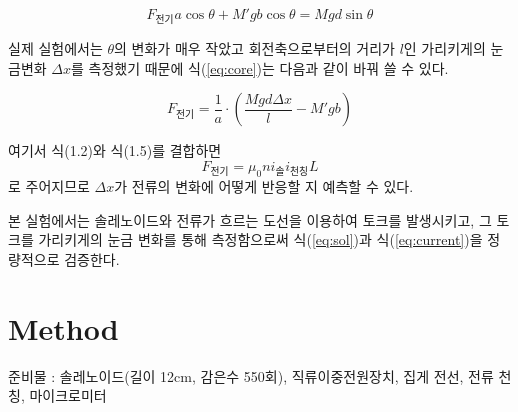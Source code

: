 \documentclass[a4paper]{article}
\begin{document}
	\begin{equation}
		F_{전기}a\cos{\theta} + M'gb\cos{\theta} = Mgd\sin{\theta}
		\label{eq:core}
	\end{equation}

	실제 실험에서는 $\theta$의 변화가 매우 작았고 회전축으로부터의 거리가 $l$인 가리키게의 눈금변화 $\Delta{}x$를 측정했기 때문에 식(\ref{eq:core})는 다음과 같이 바꿔 쓸 수 있다. 

	\begin{equation}
		F_{전기} = \frac{1}{a} \cdot (\frac{Mgd\Delta{}x}{l} - M'gb) 
	\end{equation}

	여기서 식(1.2)와 식(1.5)를 결합하면 
	\begin{equation}
		F_{전기} = \mu_{0}ni_{솔}i_{천칭}L
	\end{equation}
	로 주어지므로 $\Delta{}x$가 전류의 변화에 어떻게 반응할 지 예측할 수 있다.

	본 실험에서는 솔레노이드와 전류가 흐르는 도선을 이용하여 토크를 발생시키고, 그 토크를 가리키게의 눈금 변화를 통해 측정함으로써 식(\ref{eq:sol})과 식(\ref{eq:current})을 정량적으로 검증한다.
	
	\newpage

	\section{Method}
	\vspace{-1cm}
		\begin{figure}[h]
			\centering
		\end{figure}
		준비물 : 솔레노이드(길이 12\si{cm}, 감은수 550회), 직류이중전원장치, 집게 전선, 전류 천칭, 마이크로미터
\end{document}
